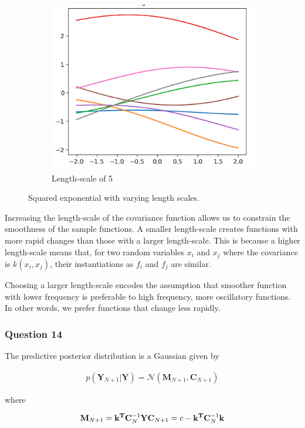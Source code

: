 \documentclass[10pt, a4paper, twocolumn]{article} %
\begin{document}
\begin{figure}[htb]
\begin{subfigure}{.5\linewidth}
\includegraphics[width=0.9\linewidth]{ls5.png}
\caption{Length-scale of 5}
\end{subfigure}
\caption{Squared exponential with varying length scales. }
\label{fig:q13}
\end{figure}

Increasing the length-scale of the covariance function allows us to constrain the smoothness of the sample functions. A smaller length-scale creates functions with more rapid changes than those with a larger length-scale. This is because a higher length-scale means that, for two random variables $x_i$ and $x_j$ where the covariance is $k(x_i, x_j)$, their instantiations as $f_i$ and $f_j$ are similar. 

Choosing a larger length-scale encodes the assumption that smoother function with lower frequency is preferable to high frequency, more oscillatory functions. In other words, we prefer functions that change less rapidly.

\subsubsection{Question 14}

The predictive posterior distribution is a Gaussian given by 

\begin{align}
  p(\mathbf{Y}_{N+1}|\mathbf{Y}) = \mathcal{N}(\mathbf{M}_{N+1}, \mathbf{C}_{N+1})
\end{align}

where

\begin{equation}
  \mathbf{M}_{N+1} = \mathbf{k^T}\mathbf{C}_N^{-1}\mathbf{Y} \\
  \mathbf{C}_{N+1} = c - \mathbf{k^T}\mathbf{C}_N^{-1}\mathbf{k} 
\end{equation}
\end{document}
